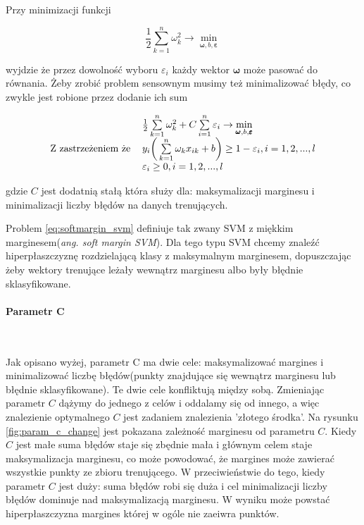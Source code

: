 \documentclass[paper=a4, fontsize=11pt]{scrartcl} %
\numberwithin{equation}{section} %
\numberwithin{figure}{section} %
\newcommand{\myparagraph}[1]{\paragraph{#1}\mbox{}\\}
\begin{document}
    \par Przy minimizacji funkcji

    \begin{equation}
        \frac{1}{2} \sum\limits_{k=1}^n \omega_{k}^2 \rightarrow \min\limits_{\pmb{\omega},b,
        \pmb{\varepsilon}}
    \end{equation}

    \par wyjdzie że przez dowolność wyboru $\varepsilon_i$ każdy wektor $\pmb{\omega}$ może
    pasować do równania. Żeby zrobić problem sensownym musimy też minimalizować błędy, co
    zwykle jest robione przez dodanie ich sum

    \begin{equation} \label{eq:softmargin_svm}
        \begin{tabular}{rl}
            & $\frac{1}{2}\sum\limits_{k=1}^{n}\omega_k^2 + C\sum\limits_{i=1}^{n}\varepsilon_i
            \rightarrow \min\limits_{\pmb{\omega},b,\pmb{\varepsilon}}$ \\
            Z zastrzeżeniem że 
            & $y_i \bigg(\sum\limits_{k=1}^n \omega_k x_{ik} + b \bigg) \geq 1 - \varepsilon_i,
            i=1,2,...,l$ \\
            & $\varepsilon_i \geq 0, i=1,2,...,l$
        \end{tabular}
    \end{equation}

    gdzie $C$ jest dodatnią stałą która służy dla: maksymalizacji marginesu i minimalizacji
    liczby błędów na danych trenujących.
    \par Problem \ref{eq:softmargin_svm} definiuje tak zwany SVM z miękkim
    marginesem(\textit{ang. soft margin SVM}). Dla tego typu SVM chcemy znaleźć
    hiperpłaszczyznę rozdzielającą klasy z maksymalnym marginesem, dopuszczając żeby wektory
    trenujące leżały wewnątrz marginesu albo były błędnie sklasyfikowane.

\myparagraph{Parametr C}
    \par Jak opisano wyżej, parametr C ma dwie cele: maksymalizować margines i minimalizować
    liczbę błędów(punkty znajdujące się wewnątrz marginesu lub błędnie sklasyfikowane). Te dwie
    cele konfliktują między sobą. Zmieniając parametr $C$ dążymy do jednego z celów i oddalamy
    się od innego, a więc znalezienie optymalnego $C$ jest zadaniem znalezienia 'złotego
    środka'. Na rysunku \ref{fig:param_c_change} jest pokazana zależność marginesu od parametru
    $C$. Kiedy $C$ jest małe suma błędów staje się zbędnie mała i głównym celem staje
    maksymalizacja marginesu, co może powodować, że margines może zawierać wszystkie punkty ze
    zbioru trenującego. W przeciwieństwie do tego, kiedy parametr $C$ jest duży: suma błędów
    robi się duża i cel minimalizacji liczby błędów dominuje nad maksymalizacją marginesu. W
    wyniku może powstać hiperpłaszczyzna margines której w ogóle nie zaeiwra punktów.
\end{document}
